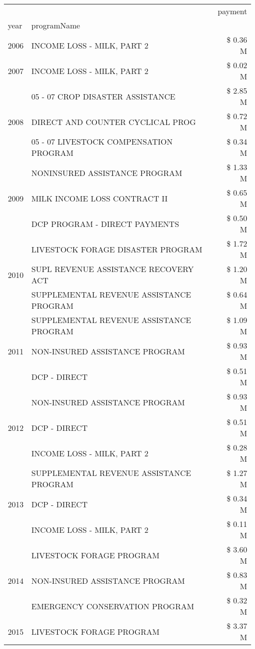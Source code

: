 \begin{tabular}{llr}
\toprule
 &  & payment \\
year & programName &  \\
\midrule
2006 & INCOME LOSS - MILK, PART 2 & \$ 0.36 M \\
\cline{1-3}
2007 & INCOME LOSS - MILK, PART 2 & \$ 0.02 M \\
\cline{1-3}
\multirow[t]{3}{*}{2008} & 05 - 07 CROP DISASTER ASSISTANCE & \$ 2.85 M \\
 & DIRECT AND COUNTER CYCLICAL PROG & \$ 0.72 M \\
 & 05 - 07 LIVESTOCK COMPENSATION PROGRAM & \$ 0.34 M \\
\cline{1-3}
\multirow[t]{3}{*}{2009} & NONINSURED ASSISTANCE PROGRAM & \$ 1.33 M \\
 & MILK INCOME LOSS CONTRACT II & \$ 0.65 M \\
 & DCP PROGRAM - DIRECT PAYMENTS & \$ 0.50 M \\
\cline{1-3}
\multirow[t]{3}{*}{2010} & LIVESTOCK FORAGE DISASTER  PROGRAM & \$ 1.72 M \\
 & SUPL REVENUE ASSISTANCE RECOVERY ACT & \$ 1.20 M \\
 & SUPPLEMENTAL REVENUE ASSISTANCE PROGRAM & \$ 0.64 M \\
\cline{1-3}
\multirow[t]{3}{*}{2011} & SUPPLEMENTAL REVENUE ASSISTANCE PROGRAM & \$ 1.09 M \\
 & NON-INSURED ASSISTANCE PROGRAM & \$ 0.93 M \\
 & DCP - DIRECT & \$ 0.51 M \\
\cline{1-3}
\multirow[t]{3}{*}{2012} & NON-INSURED ASSISTANCE PROGRAM & \$ 0.93 M \\
 & DCP - DIRECT & \$ 0.51 M \\
 & INCOME LOSS - MILK, PART 2 & \$ 0.28 M \\
\cline{1-3}
\multirow[t]{3}{*}{2013} & SUPPLEMENTAL REVENUE ASSISTANCE PROGRAM & \$ 1.27 M \\
 & DCP - DIRECT & \$ 0.34 M \\
 & INCOME LOSS - MILK, PART 2 & \$ 0.11 M \\
\cline{1-3}
\multirow[t]{3}{*}{2014} & LIVESTOCK FORAGE PROGRAM & \$ 3.60 M \\
 & NON-INSURED ASSISTANCE PROGRAM & \$ 0.83 M \\
 & EMERGENCY CONSERVATION PROGRAM & \$ 0.32 M \\
\cline{1-3}
\multirow[t]{3}{*}{2015} & LIVESTOCK FORAGE PROGRAM & \$ 3.37 M \\

\end{tabular}
